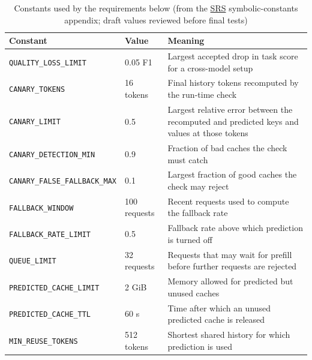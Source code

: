 \documentclass{article}
\newcommand{\srs}{\href{https://tandemkv.github.io/Tandem/SRS-Volere/SRS.pdf}{SRS}}
\begin{document}
\begin{table}[h]
\centering
\small
\caption{Constants used by the requirements below (from the \srs{}
symbolic-constants appendix; draft values reviewed before final tests)}
\label{tab:constants}
\begin{tabularx}{\textwidth}{@{}llX@{}}
\toprule Constant & Value & Meaning\\\midrule
\texttt{QUALITY\_LOSS\_LIMIT} & 0.05 F1 & Largest accepted drop in task score
for a cross-model setup\\
\texttt{CANARY\_TOKENS} & 16 tokens & Final history tokens recomputed by the
run-time check\\
\texttt{CANARY\_LIMIT} & 0.5 & Largest relative error between the recomputed
and predicted keys and values at those tokens\\
\texttt{CANARY\_DETECTION\_MIN} & 0.9 & Fraction of bad caches the check
must catch\\
\texttt{CANARY\_FALSE\_FALLBACK\_MAX} & 0.1 & Largest fraction of good caches
the check may reject\\
\texttt{FALLBACK\_WINDOW} & 100 requests & Recent requests used to compute the
fallback rate\\
\texttt{FALLBACK\_RATE\_LIMIT} & 0.5 & Fallback rate above which prediction
is turned off\\
\texttt{QUEUE\_LIMIT} & 32 requests & Requests that may wait for prefill
before further requests are rejected\\
\texttt{PREDICTED\_CACHE\_LIMIT} & 2 GiB & Memory allowed for predicted but
unused caches\\
\texttt{PREDICTED\_CACHE\_TTL} & 60 s & Time after which an unused predicted
cache is released\\
\texttt{MIN\_REUSE\_TOKENS} & 512 tokens & Shortest shared history for which
prediction is used\\
\bottomrule
\end{tabularx}
\end{table}
\end{document}
